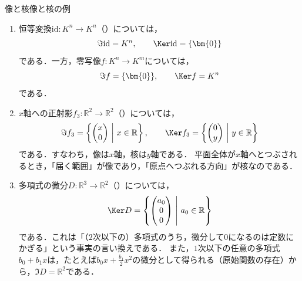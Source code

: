 \begin{example}{像と核}{像と核の例}
  \begin{enumerate}[label=(\arabic*),leftmargin=3.2em]
    \item 恒等変換$\mathrm{id} \colon K^n \to K^n$（）については，
      \[
        \Im \mathrm{id} = K^n, \qquad \Ker \mathrm{id} = \{\bm{0}\}
      \]
      である．一方，零写像$f \colon K^n \to K^m$については，
      \[
        \Im f = \{\bm{0}\}, \qquad \Ker f = K^n
      \]
      である．
    \item $x$軸への正射影$f_3 \colon \mathbb{R}^2 \to \mathbb{R}^2$（）については，
      \[
        \Im f_3 = \left\{ \begin{pmatrix} x \\ 0 \end{pmatrix} ~\middle|~ x \in \mathbb{R} \right\}, \qquad
        \Ker f_3 = \left\{ \begin{pmatrix} 0 \\ y \end{pmatrix} ~\middle|~ y \in \mathbb{R} \right\}
      \]
      である．すなわち，像は$x$軸，核は$y$軸である．
      平面全体が$x$軸へとつぶされるとき，「届く範囲」が像であり，「原点へつぶれる方向」が核なのである．
    \item 多項式の微分$D \colon \mathbb{R}^3 \to \mathbb{R}^2$（）については，
      \[
        \Ker D = \left\{ \begin{pmatrix} a_0 \\ 0 \\ 0 \end{pmatrix} ~\middle|~ a_0 \in \mathbb{R} \right\}
      \]
      である．これは「（$2$次以下の）多項式のうち，微分して$0$になるのは定数にかぎる」という事実の言い換えである．
      また，$1$次以下の任意の多項式$b_0 + b_1 x$は，たとえば$b_0 x + \frac{b_1}{2} x^2$の微分として得られる（原始関数の存在）から，$\Im D = \mathbb{R}^2$である．
  \end{enumerate}
\end{example}

